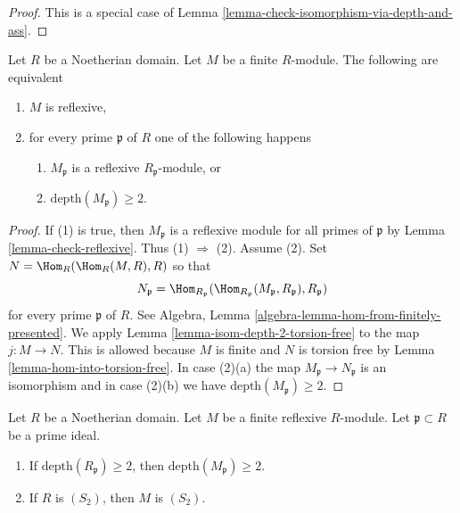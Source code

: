 \begin{proof}
This is a special case of
Lemma \ref{lemma-check-isomorphism-via-depth-and-ass}.
\end{proof}

\begin{lemma}
\label{lemma-reflexive-depth-2}
Let $R$ be a Noetherian domain. Let $M$ be a finite $R$-module.
The following are equivalent
\begin{enumerate}
\item $M$ is reflexive,
\item for every prime $\mathfrak p$ of $R$ one of the following happens
\begin{enumerate}
\item $M_\mathfrak p$ is a reflexive $R_\mathfrak p$-module, or
\item $\text{depth}(M_\mathfrak p) \geq 2$.
\end{enumerate}
\end{enumerate}
\end{lemma}

\begin{proof}
If (1) is true, then $M_\mathfrak p$ is a reflexive module
for all primes of $\mathfrak p$ by Lemma \ref{lemma-check-reflexive}.
Thus (1) $\Rightarrow$ (2). Assume (2). Set $N = \Hom_R(\Hom_R(M, R), R)$
so that
$$
N_\mathfrak p =
\Hom_{R_\mathfrak p}(
\Hom_{R_\mathfrak p}(M_\mathfrak p, R_\mathfrak p), R_\mathfrak p)
$$
for every prime $\mathfrak p$ of $R$.
See Algebra, Lemma \ref{algebra-lemma-hom-from-finitely-presented}.
We apply Lemma \ref{lemma-isom-depth-2-torsion-free} to the map
$j : M \to N$. This is allowed because $M$ is finite and
$N$ is torsion free by Lemma \ref{lemma-hom-into-torsion-free}.
In case (2)(a) the map $M_\mathfrak p \to N_\mathfrak p$ is an
isomorphism and in case (2)(b) we have $\text{depth}(M_\mathfrak p) \geq 2$.
\end{proof}

\begin{lemma}
\label{lemma-reflexive-S2}
Let $R$ be a Noetherian domain. Let $M$ be a finite reflexive $R$-module.
Let $\mathfrak p \subset R$ be a prime ideal.
\begin{enumerate}
\item If $\text{depth}(R_\mathfrak p) \geq 2$, then
$\text{depth}(M_\mathfrak p) \geq 2$.
\item If $R$ is $(S_2)$, then $M$ is $(S_2)$.
\end{enumerate}
\end{lemma}

